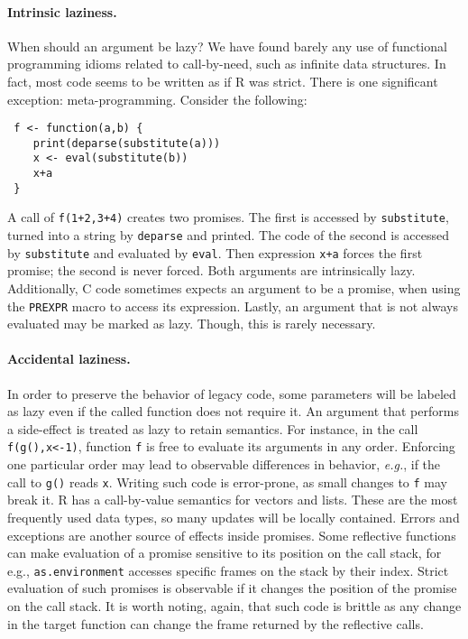 \documentclass[review,screen,acmsmall]{acmart}
\renewcommand{\c}[1]{\lstinline |#1|\xspace}
\newcommand{\eg}{\emph{e.g.},\xspace}
\begin{document}
\paragraph{Intrinsic laziness.} When should an  argument be lazy?
We have found barely any use of functional programming idioms related to
call-by-need, such as infinite data structures. In fact, most code seems to be
written as if R was strict. There is one significant exception:
meta-programming. Consider the following:
\begin{lstlisting}
 f <- function(a,b) {
    print(deparse(substitute(a)))
    x <- eval(substitute(b))
    x+a
 }
\end{lstlisting}

\medskip

A call of \c{f(1+2,3+4)} creates two promises. The first is accessed by
\c{substitute}, turned into a string by \c{deparse} and printed. The code of the
second is accessed by \c{substitute} and evaluated by \c{eval}. Then expression
\c{x+a} forces the first promise; the second is never forced. Both arguments are
intrinsically lazy.
Additionally, C code sometimes expects an
argument to be a promise, when using the \c{PREXPR} macro to access its
expression. Lastly, an argument that is not always evaluated may be marked as
lazy. Though, this is rarely necessary.

\paragraph{Accidental laziness.} In order to preserve the behavior of legacy
code, some parameters will be labeled as lazy even if the called function does
not require it. An argument that performs a side-effect is treated as lazy to
retain semantics. For instance, in the call \c{f(g(),x<-1)}, function \c f is
free to evaluate its arguments in any order. Enforcing one particular order may
lead to observable differences in behavior, \eg if the call to \c{g()} reads
\c{x}. Writing such code is error-prone, as small changes to \c f may break it.
R has a call-by-value semantics for vectors and lists. These are the most
frequently used data types, so many updates will be locally contained. Errors
and exceptions are another source of effects inside promises. Some reflective
functions can make evaluation of a promise sensitive to its position on the call
stack, for e.g., \c{as.environment} accesses specific frames on the stack by
their index. Strict evaluation of such promises is observable if it changes the
position of the promise on the call stack. It is worth noting, again, that such
code is brittle as any change in the target function can change the frame
returned by the reflective calls.
\end{document}
